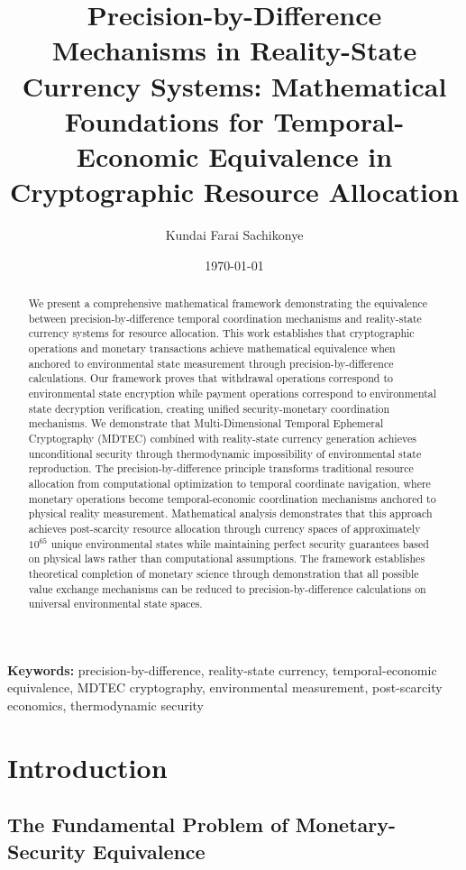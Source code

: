 \documentclass[12pt,a4paper]{article}
\title{\textbf{Precision-by-Difference Mechanisms in Reality-State Currency Systems: Mathematical Foundations for Temporal-Economic Equivalence in Cryptographic Resource Allocation}}
\author{Kundai Farai Sachikonye}
\date{\today}
\begin{document}
\maketitle

\begin{abstract}
We present a comprehensive mathematical framework demonstrating the equivalence between precision-by-difference temporal coordination mechanisms and reality-state currency systems for resource allocation. This work establishes that cryptographic operations and monetary transactions achieve mathematical equivalence when anchored to environmental state measurement through precision-by-difference calculations. Our framework proves that withdrawal operations correspond to environmental state encryption while payment operations correspond to environmental state decryption verification, creating unified security-monetary coordination mechanisms. We demonstrate that Multi-Dimensional Temporal Ephemeral Cryptography (MDTEC) combined with reality-state currency generation achieves unconditional security through thermodynamic impossibility of environmental state reproduction. The precision-by-difference principle transforms traditional resource allocation from computational optimization to temporal coordinate navigation, where monetary operations become temporal-economic coordination mechanisms anchored to physical reality measurement. Mathematical analysis demonstrates that this approach achieves post-scarcity resource allocation through currency spaces of approximately $10^{65}$ unique environmental states while maintaining perfect security guarantees based on physical laws rather than computational assumptions. The framework establishes theoretical completion of monetary science through demonstration that all possible value exchange mechanisms can be reduced to precision-by-difference calculations on universal environmental state spaces.
\end{abstract}

\textbf{Keywords:} precision-by-difference, reality-state currency, temporal-economic equivalence, MDTEC cryptography, environmental measurement, post-scarcity economics, thermodynamic security

\section{Introduction}

\subsection{The Fundamental Problem of Monetary-Security Equivalence}
\end{document}
